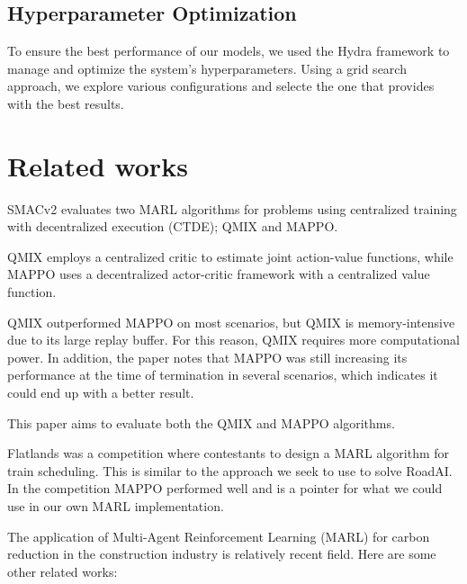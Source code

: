 \documentclass[conference]{IEEEtran}
\begin{document}
\subsection{Hyperparameter Optimization}
To ensure the best performance of our models, we used the Hydra framework\cite{Yadan2019Hydra} to manage and optimize the system's hyperparameters. Using a grid search approach, we explore various configurations and selecte the one that provides with the best results.




\section{Related works}
SMACv2\cite{ellis2022smacv2} evaluates two MARL algorithms for problems using centralized training with
decentralized execution (CTDE); QMIX and MAPPO.

QMIX employs a centralized critic to estimate joint action-value functions, while MAPPO uses a decentralized
actor-critic framework with a centralized value function.

QMIX outperformed MAPPO on most scenarios, but QMIX is memory-intensive due to its large replay buffer. For
this reason, QMIX requires more computational power. In addition, the paper notes that MAPPO was still
increasing its performance at the time of termination in several scenarios, which indicates it could end up
with a better result.

This paper aims to evaluate both the QMIX and MAPPO algorithms.


Flatlands\cite{laurent2021flatland} was a competition where contestants to design a MARL algorithm for 
train scheduling. This is similar to the approach we seek to use to solve RoadAI. 
In the competition MAPPO performed well and is a pointer for what we could use in our own MARL implementation.


The application of Multi-Agent Reinforcement Learning (MARL) for carbon reduction in the construction industry is relatively recent field. Here are some other related works:
\end{document}
